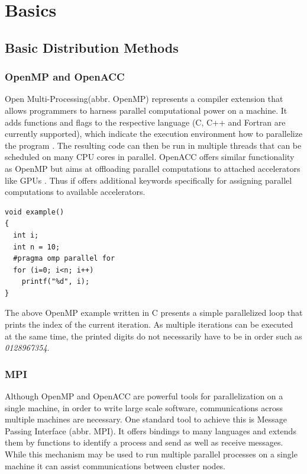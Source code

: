 \chapter{Basics}

\section{Basic Distribution Methods}
\label{distribution_basics}

\subsection*{OpenMP and OpenACC}
Open Multi-Processing(abbr. OpenMP) represents a compiler extension that allows programmers to harness parallel computational power on a machine. It adds functions and flags to the respective language (C, C++ and Fortran are currently supported), which indicate the execution environment how to parallelize the program \cite{openmp_spec}. The resulting code can then be run in multiple threads that can be scheduled on many CPU cores in parallel. OpenACC offers similar functionality as OpenMP but aims at offloading parallel computations to attached accelerators like GPUs \cite{openacc_spec}. Thus if offers additional keywords specifically for assigning parallel computations to available accelerators.

\begin{lstlisting}[caption=OpenMP Code Example,captionpos=b]
void example()
{
  int i;
  int n = 10;
  #pragma omp parallel for
  for (i=0; i<n; i++)
    printf("%d", i);
}
\end{lstlisting}

The above OpenMP example written in C presents a simple parallelized loop that prints the index of the current iteration. As multiple iterations can be executed at the same time, the printed digits do not necessarily have to be in order such as \textit{0128967354}. 

\subsection*{MPI}
Although OpenMP and OpenACC are powerful tools for parallelization on a single machine, in order to write large scale software, communications across multiple machines are necessary. One standard tool to achieve this is Message Passing Interface (abbr. MPI).
It offers bindings to many languages and extends them by functions to identify a process and send as well as receive messages. While this mechanism may be used to run multiple parallel processes on a single machine it can assist communications between cluster nodes.

